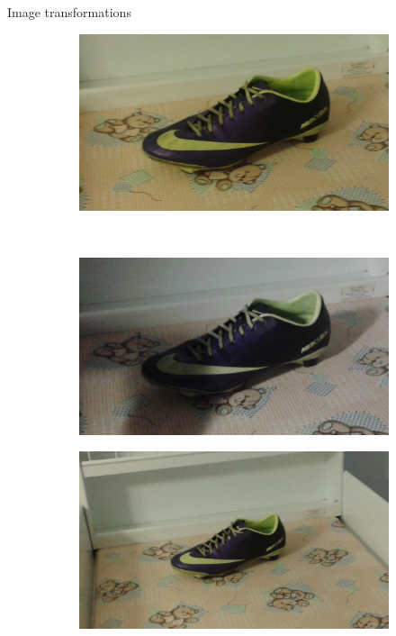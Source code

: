 \documentclass[14pt,t]{beamer}
\begin{document}
%
\begin{frame}{Image transformations}
\begin{figure}
\centering
	\begin{subfigure}[t]{0.4\textwidth}
		\includegraphics[width=\textwidth]{img/shoeOriginal.jpg}
	\end{subfigure}\\
	\vspace{0.75mm}
	\begin{subfigure}[t]{0.4\textwidth}
		\includegraphics[width=\textwidth]{img/shoeShadow.jpg}
	\end{subfigure}
	\begin{subfigure}[t]{0.4\textwidth}
		\includegraphics[width=\textwidth]{img/shoeScale.jpg}

\end{subfigure}
\end{figure}
\end{frame}
\end{document}

